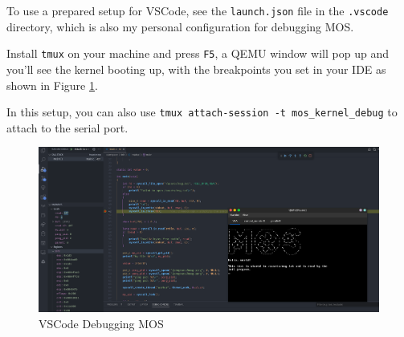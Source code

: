 To use a prepared setup for VSCode, see the \texttt{launch.json} file in the \texttt{.vscode}
directory, which is also my personal configuration for debugging MOS.

Install \texttt{tmux} on your machine and press \texttt{F5}, a QEMU window will pop up and you'll see the kernel booting up, with the breakpoints
you set in your IDE as shown in Figure \ref{fig:vscode-debugging}.

In this setup, you can also use \texttt{tmux attach-session -t mos\_kernel\_debug} to attach to the serial
port.

\begin{figure}[ht]
    \centering
    \includegraphics[width=\textwidth]{assets/c1.vscode-debugging.png}
    \caption{VSCode Debugging MOS}
    \label{fig:vscode-debugging}
\end{figure}

